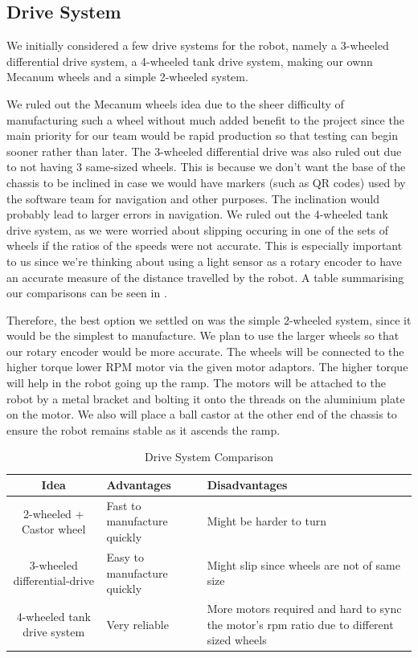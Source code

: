 \documentclass{article}
\begin{document}
\subsection{Drive System}
\quad \quad We initially considered a few drive systems for the robot, namely a 3-wheeled differential drive system, a 4-wheeled tank drive system, making our ownn Mecanum wheels and a simple 2-wheeled system. 

\quad We ruled out the Mecanum wheels idea due to the sheer difficulty of manufacturing such a wheel without much added benefit to the project since the main priority for our team would be rapid production so that testing can begin sooner rather than later. The 3-wheeled differential drive was also ruled out due to not having 3 same-sized wheels. This is because we don't want the base of the chassis to be inclined in case we would have markers (such as QR codes) used by the software team for navigation and other purposes. The inclination would probably lead to larger errors in navigation. We ruled out the 4-wheeled tank drive system, as we were worried about slipping occuring in one of the sets of wheels if the ratios of the speeds were not accurate. This is especially important to us since we're thinking about using a light sensor as a rotary encoder to have an accurate measure of the distance travelled by the robot. A table summarising our comparisons can be seen in .

\quad Therefore, the best option we settled on was the simple 2-wheeled system, since it would be the simplest to manufacture. We plan to use the larger wheels so that our rotary encoder would be more accurate. The wheels will be connected to the higher torque lower RPM motor via the given motor adaptors. The higher torque will help in the robot going up the ramp. The motors will be attached to the robot by a metal bracket and bolting it onto the threads on the aluminium plate on the motor. We also will place a ball castor at the other end of the chassis to ensure the robot remains stable as it ascends the ramp.

\begin{table}[]
    \centering
    \begin{tabular}{|c|p{5cm}|p{5cm}|}
        \hline
        Idea & Advantages & Disadvantages \\
        \hline
        2-wheeled + Castor wheel & Fast to manufacture quickly& Might be harder to turn \\
        3-wheeled differential-drive & Easy to manufacture quickly & Might slip since wheels are not of same size \\
        4-wheeled tank drive system & Very reliable & More motors required and hard to sync the motor's rpm ratio due to different sized wheels \\
        \hline
    \end{tabular}
    \caption{Drive System Comparison}
    \label{tab:drive_comp}
\end{table}
\end{document}
